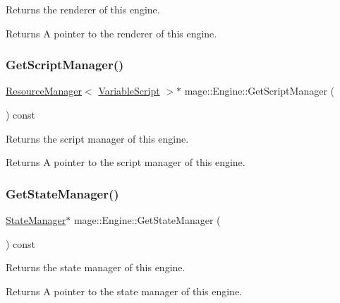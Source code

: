 Returns the renderer of this engine.

\begin{DoxyReturn}{Returns}
A pointer to the renderer of this engine. 
\end{DoxyReturn}
\hypertarget{classmage_1_1_engine_af55c457336dcbc0e940578425c74d868}{}\label{classmage_1_1_engine_af55c457336dcbc0e940578425c74d868} 
\subsubsection{\texorpdfstring{Get\+Script\+Manager()}{GetScriptManager()}}
{\footnotesize\ttfamily \hyperlink{classmage_1_1_resource_manager}{Resource\+Manager}$<$ \hyperlink{classmage_1_1_variable_script}{Variable\+Script} $>$$\ast$ mage\+::\+Engine\+::\+Get\+Script\+Manager (\begin{DoxyParamCaption}{ }\end{DoxyParamCaption}) const}

Returns the script manager of this engine.

\begin{DoxyReturn}{Returns}
A pointer to the script manager of this engine. 
\end{DoxyReturn}
\hypertarget{classmage_1_1_engine_a4f35bccc3784de531245a2549d537745}{}\label{classmage_1_1_engine_a4f35bccc3784de531245a2549d537745} 
\subsubsection{\texorpdfstring{Get\+State\+Manager()}{GetStateManager()}}
{\footnotesize\ttfamily \hyperlink{classmage_1_1_state_manager}{State\+Manager}$\ast$ mage\+::\+Engine\+::\+Get\+State\+Manager (\begin{DoxyParamCaption}{ }\end{DoxyParamCaption}) const}

Returns the state manager of this engine.

\begin{DoxyReturn}{Returns}
A pointer to the state manager of this engine. 
\end{DoxyReturn}
\hypertarget{classmage_1_1_engine_ac43f1de00841a6fe51c9e4567ac47bd1}{}\label{classmage_1_1_engine_ac43f1de00841a6fe51c9e4567ac47bd1} 

